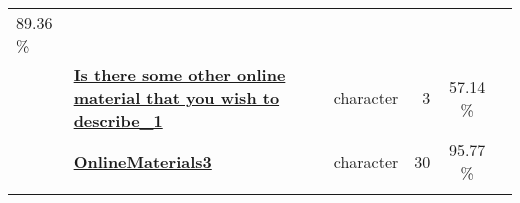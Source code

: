 \documentclass[]{article}
\begin{document}
\begin{longtable}[]{@{}lllrcl@{}}
\begin{minipage}[t]{0.10\columnwidth}
89.36 \%\strut
\end{minipage} & \begin{minipage}[t]{0.12\columnwidth}\raggedright\strut
\strut
\end{minipage}\tabularnewline
\begin{minipage}[t]{0.07\columnwidth}\raggedright\strut
\strut
\end{minipage} & \begin{minipage}[t]{0.35\columnwidth}\raggedright\strut
\textbf{\protect\hyperlink{is-there-some-other-online-material-that-you-wish-to-describe_1}{Is
there some other online material that you wish to describe\_1}}\strut
\end{minipage} & \begin{minipage}[t]{0.11\columnwidth}\raggedright\strut
character\strut
\end{minipage} & \begin{minipage}[t]{0.10\columnwidth}\raggedleft\strut
3\strut
\end{minipage} & \begin{minipage}[t]{0.10\columnwidth}\centering\strut
57.14 \%\strut
\end{minipage} & \begin{minipage}[t]{0.12\columnwidth}\raggedright\strut
\strut
\end{minipage}\tabularnewline
\begin{minipage}[t]{0.07\columnwidth}\raggedright\strut
\strut
\end{minipage} & \begin{minipage}[t]{0.35\columnwidth}\raggedright\strut
\textbf{\protect\hyperlink{onlinematerials3}{OnlineMaterials3}}\strut
\end{minipage} & \begin{minipage}[t]{0.11\columnwidth}\raggedright\strut
character\strut
\end{minipage} & \begin{minipage}[t]{0.10\columnwidth}\raggedleft\strut
30\strut
\end{minipage} & \begin{minipage}[t]{0.10\columnwidth}\centering\strut
95.77 \%\strut
\end{minipage} & \begin{minipage}[t]{0.12\columnwidth}\raggedright\strut
\strut
\end{minipage}\tabularnewline
\begin{minipage}[t]{0.07\columnwidth}\raggedright\strut
\strut
\end{minipage} & \begin{minipage}[t]{0.35\columnwidth}\raggedright\strut

\end{minipage}
\end{longtable}
\end{document}
